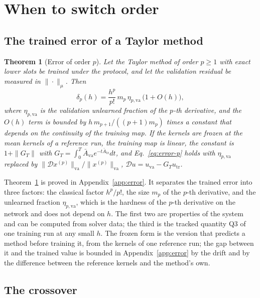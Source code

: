 \documentclass[11pt]{article}
\newtheorem{theorem}{Theorem}
\theoremstyle{definition}
\theoremstyle{remark}
\newcommand{\tr}{\mathrm{tr}}
\newcommand{\va}{\mathrm{va}}
\newcommand{\Dmap}{\mathcal{D}}
\begin{document}
\section{When to switch order}\label{sec:switch}

\subsection{The trained error of a Taylor method}

\begin{theorem}[Error of order $p$]\label{thm:error}
Let the Taylor method of order $p \ge 1$ with exact lower slots be trained under the protocol, and let the validation residual be measured in $\|\cdot\|_\mu$.
Then
\begin{equation}\label{eq:error-p}
\delta_p(h) = \frac{h^p}{p!}\,m_p\,\eta_{p,\va}\,\big(1 + O(h)\big),
\end{equation}
where $\eta_{p,\va}$ is the validation unlearned fraction of the $p$-th derivative, and the $O(h)$ term is bounded by $h\,m_{p+1}/((p+1)m_p)$ times a constant that depends on the continuity of the training map.
If the kernels are frozen at the mean kernels of a reference run, the training map is linear, the constant is $1 + \|G_T\|$ with $G_T = \int_0^T\bar A_\va e^{-t\bar A_\tr}dt$, and Eq.~\eqref{eq:error-p} holds with $\eta_{p,\va}$ replaced by $\|\Dmap x^{(p)}\|_\va/\|x^{(p)}\|_\va$, $\Dmap u = u_\va - G_T u_\tr$.
\end{theorem}

Theorem~\ref{thm:error} is proved in Appendix~\ref{app:error}.
It separates the trained error into three factors: the classical factor $h^p/p!$, the size $m_p$ of the $p$-th derivative, and the unlearned fraction $\eta_{p,\va}$, which is the hardness of the $p$-th derivative on the network and does not depend on $h$.
The first two are properties of the system and can be computed from solver data; the third is the tracked quantity Q3 of one training run at any small $h$.
The frozen form is the version that predicts a method before training it, from the kernels of one reference run; the gap between it and the trained value is bounded in Appendix~\ref{app:error} by the drift and by the difference between the reference kernels and the method's own.

\subsection{The crossover}
\end{document}
